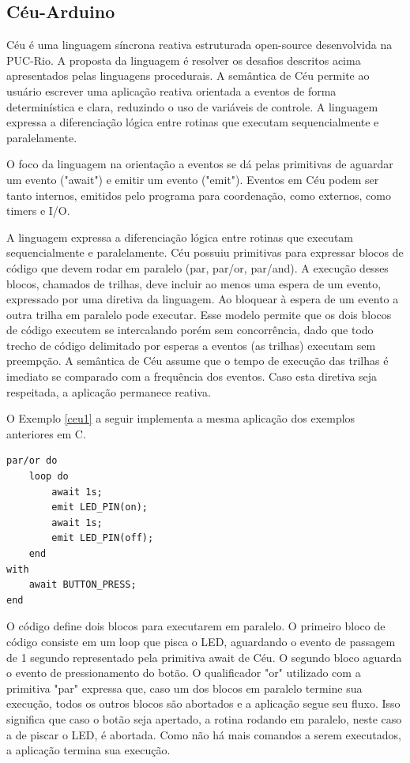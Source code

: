 \documentclass[11pt]{article}
\begin{document}
\subsection{Céu-Arduino}
\tab Céu é uma linguagem síncrona reativa estruturada open-source desenvolvida na PUC-Rio.\cite{santanna2012}\cite{githubceu} A proposta da linguagem é resolver os desafios descritos acima apresentados pelas linguagens procedurais. A semântica de Céu permite ao usuário escrever uma aplicação reativa orientada a eventos de forma determinística e clara, reduzindo o uso de variáveis de controle. A linguagem expressa a diferenciação lógica entre rotinas que executam sequencialmente e paralelamente.
\par O foco da linguagem na orientação a eventos se dá pelas primitivas de aguardar um evento ("await") e emitir um evento ("emit"). Eventos em Céu podem ser tanto internos, emitidos pelo programa para coordenação, como externos, como timers e I/O.
\par A linguagem expressa a diferenciação lógica entre rotinas que executam sequencialmente e paralelamente. Céu possuiu primitivas para expressar blocos de código que devem rodar em paralelo (par, par/or, par/and). A execução desses blocos, chamados de trilhas, deve incluir ao menos uma espera de um evento, expressado por uma diretiva da linguagem. Ao bloquear à espera de um evento a outra trilha em paralelo pode executar. Esse modelo permite que os dois blocos de código executem se intercalando porém sem concorrência, dado que todo trecho de código delimitado por esperas a eventos (as trilhas) executam sem preempção. A semântica de Céu assume que o tempo de execução das trilhas é imediato se comparado com a frequência dos eventos. Caso esta diretiva seja respeitada, a aplicação permanece reativa.
\par O Exemplo \ref{ceu1} a seguir implementa a mesma aplicação dos exemplos anteriores em C.  
\begin{lstlisting}[style=CStyle,label=ceu1,caption=Aplicação em Céu]
par/or do
    loop do
        await 1s;
        emit LED_PIN(on);
        await 1s;
        emit LED_PIN(off);
    end
with
    await BUTTON_PRESS;
end
\end{lstlisting}
\par O código define dois blocos para executarem em paralelo. O primeiro bloco de código consiste em um loop que pisca o LED, aguardando o evento de passagem de 1 segundo representado pela primitiva await de Céu. O segundo bloco aguarda o evento de pressionamento do botão. O qualificador "or" utilizado com a primitiva "par" expressa que, caso um dos blocos em paralelo termine sua execução, todos os outros blocos são abortados e a aplicação segue seu fluxo. Isso significa que caso o botão seja apertado, a rotina rodando em paralelo, neste caso a de piscar o LED, é abortada. Como não há mais comandos a serem executados, a aplicação termina sua execução.
\end{document}
